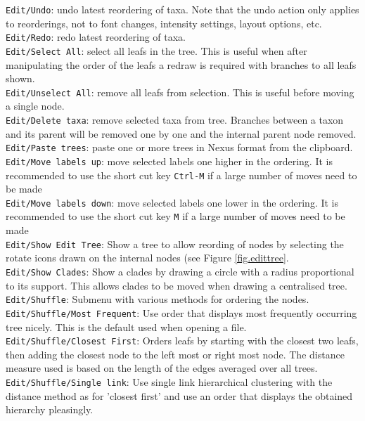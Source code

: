 \documentclass{article}
\begin{document}
\noindent
{\tt Edit/Undo}: undo latest reordering of taxa. Note that the undo action only applies
to reorderings, not to font changes, intensity settings, layout options, etc.\\
{\tt Edit/Redo}: redo latest reordering of taxa.\\
{\tt Edit/Select All}: select all leafs in the tree. This is useful when after manipulating
the order of the leafs a redraw is required with branches to all leafs shown.\\
{\tt Edit/Unselect All}: remove all leafs from selection. This is useful before moving a single
node.\\
{\tt Edit/Delete taxa}: remove selected taxa from tree. Branches between a taxon and its parent
will be removed one by one and the internal parent node removed.\\
{\tt Edit/Paste trees}: paste one or more trees in Nexus format from the clipboard.\\
{\tt Edit/Move labels up}: move selected labels one higher in the ordering. It is recommended to
use the short cut key {\tt Ctrl-M} if a large number of moves need to be made\\
{\tt Edit/Move labels down}: move selected labels one lower in the ordering. It is recommended to
use the short cut key {\tt M} if a large number of moves need to be made\\
{\tt Edit/Show Edit Tree}: Show a tree to allow reording of nodes by selecting the rotate icons
drawn on the internal nodes (see Figure \ref{fig.edittree}.\\
{\tt Edit/Show Clades}: Show a clades by drawing a circle with a radius proportional to its
support. This allows clades to be moved when drawing a centralised tree.\\
{\tt Edit/Shuffle}: Submenu with various methods for ordering the nodes.\\
{\tt Edit/Shuffle/Most Frequent}: Use order that displays most frequently occurring tree nicely. 
This is the default used when opening a file.\\
{\tt Edit/Shuffle/Closest First}: Orders leafs by starting with the closest two leafs, then
adding the closest node to the left most or right most node. The distance measure used is
based on the length of the edges averaged over all trees.\\
{\tt Edit/Shuffle/Single link}: Use single link hierarchical clustering with the distance method
as for 'closest first' and use an order that displays the obtained hierarchy pleasingly.\\
\end{document}
